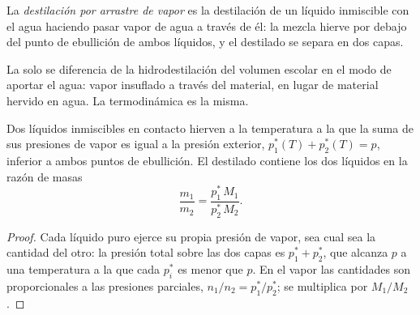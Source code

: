 \begin{definition}\label{def:b2:liquid-vapour-diagrams:steam-distillation}
La \emph{destilación por arrastre de vapor} es la destilación de un
líquido inmiscible con el agua haciendo pasar vapor de agua a través de él: la mezcla hierve
por debajo del punto de ebullición de ambos líquidos, y el destilado se separa en
dos capas.
\end{definition}

La  solo se diferencia de la hidrodestilación del volumen escolar
en el modo de aportar el agua: vapor insuflado a través del material, en lugar de
material hervido en agua. La termodinámica es la misma.

\begin{proposition}\label{prop:b2:liquid-vapour-diagrams:steam}
Dos líquidos inmiscibles en contacto hierven a la temperatura a la que la suma de
sus presiones de vapor es igual a la presión exterior, $p_1^*(T) + p_2^*(T) =
p$, inferior a ambos puntos de ebullición. El destilado contiene los dos líquidos
en la razón de masas
\[
  \frac{m_1}{m_2} = \frac{p_1^*\,M_1}{p_2^*\,M_2} .
\]
\end{proposition}

\begin{proof}
Cada líquido puro ejerce su propia presión de vapor, sea cual sea la cantidad del
otro: la presión total sobre las dos capas es $p_1^* + p_2^*$, que
alcanza $p$ a una temperatura a la que cada $p_i^*$ es menor que $p$. En el
vapor las cantidades son proporcionales a las presiones parciales, $n_1/n_2 =
p_1^*/p_2^*$; se multiplica por $M_1/M_2$.
\end{proof}

